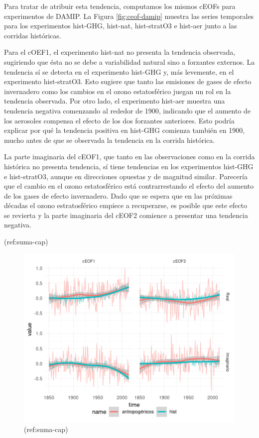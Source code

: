 \documentclass[12pt,oneside]{reedthesis}
\begin{document}
Para tratar de atribuir esta tendencia, computamos los mismos cEOFs para experimentos de DAMIP.
La Figura \ref{fig:ceof-damip} muestra las series temporales para los experimentos hist-GHG, hist-nat, hist-stratO3 e hist-aer junto a las corridas históricas.

Para el cOEF1, el experimento hist-nat no presenta la tendencia observada, sugiriendo que ésta no se debe a variabilidad natural sino a forzantes externos.
La tendencia sí se detecta en el experimento hist-GHG y, más levemente, en el experimento hist-stratO3.
Esto sugiere que tanto las emisiones de gases de efecto invernadero como los cambios en el ozono estatosférico juegan un rol en la tendencia observada.
Por otro lado, el experimento hist-aer muestra una tendencia negativa comenzando al rededor de 1900, indicando que el aumento de los aerosoles compensa el efecto de los dos forzantes anteriores.
Esto podría explicar por qué la tendencia positiva en hist-GHG comienza también en 1900, mucho antes de que se observada la tendencia en la corrida histórica.

La parte imaginaria del cEOF1, que tanto en las observaciones como en la corrida histórica no presenta tendencia, sí tiene tendencias en los experimentos hist-GHG e hist-stratO3, aunque en direcciones opuestas y de magnitud similar.
Parecería que el cambio en el ozono estatosférico está contrarrestando el efecto del aumento de los gases de efecto invernadero.
Dado que se espera que en las próximas décadas el ozono estratosférico empiece a recuperarse, es posible que este efecto se revierta y la parte imaginaria del cEOF2 comience a presentar una tendencia negativa.

(ref:suma-cap)

\begin{figure}
\includegraphics{figures/50-cmip6/suma-1} \caption{(ref:suma-cap)}\label{fig:suma}
\end{figure}
\end{document}
